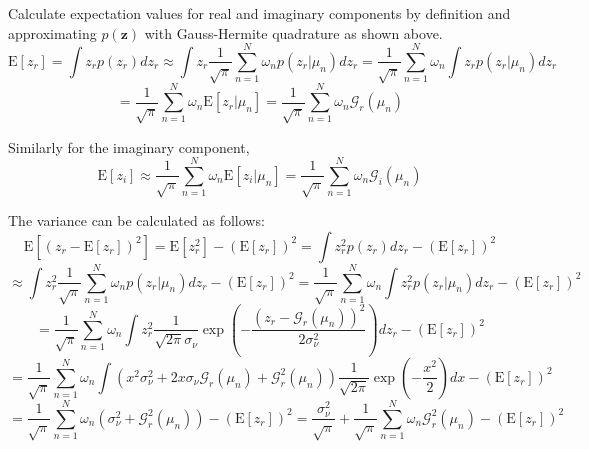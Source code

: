 \documentclass{article}         %
\theoremstyle{definition}
\theoremstyle{remark}
\newcommand{\eq}[1]{\begin{equation} #1 \end{equation}}
\newcommand{\zbf}{\mathbf{z}}
\newcommand{\Gscript}{\mathcal{G}}
\newcommand{\paren}[1]{\left(#1\right)}
\newcommand{\expect}[1]{\mathrm{E}\left[#1\right]}
\newcommand{\normpdf}[3]{\frac{1}{\sqrt{2\pi}#3}\exp\paren{-\frac{\paren{#1-#2}^2}{2#3^2}}}
\begin{document}
Calculate expectation values for real and imaginary components by definition and approximating $p\paren{\zbf}$ with Gauss-Hermite quadrature as shown above.
\eq{\expect{z_r} = \int z_r p\paren{z_r}dz_r \approx \int z_r\frac{1}{\sqrt{\pi}}\sum_{n=1}^N\omega_np\paren{z_r|\mu_n}dz_r
= \frac{1}{\sqrt{\pi}}\sum_{n=1}^N\omega_n\int z_r p\paren{z_r|\mu_n}dz_r}
\eq{=\frac{1}{\sqrt{\pi}}\sum_{n=1}^N\omega_n\expect{z_r|\mu_n} = \frac{1}{\sqrt{\pi}}\sum_{n=1}^N\omega_n\Gscript_r\paren{\mu_n}}

Similarly for the imaginary component,
\eq{\expect{z_i} \approx \frac{1}{\sqrt{\pi}}\sum_{n=1}^N\omega_n\expect{z_i|\mu_n} = \frac{1}{\sqrt{\pi}}\sum_{n=1}^N\omega_n\Gscript_i\paren{\mu_n}}

%

The variance can be calculated as follows:
\eq{\expect{\paren{z_r-\expect{z_r}}^2} = \expect{z_r^2}-\paren{\expect{z_r}}^2 = \int z_r^2p\paren{z_r}dz_r-\paren{\expect{z_r}}^2}
\eq{\approx \int z_r^2\frac{1}{\sqrt{\pi}}\sum_{n=1}^N\omega_np\paren{z_r|\mu_n}dz_r-\paren{\expect{z_r}}^2
= \frac{1}{\sqrt{\pi}}\sum_{n=1}^N\omega_n\int z_r^2p\paren{z_r|\mu_n}dz_r-\paren{\expect{z_r}}^2}
\eq{= \frac{1}{\sqrt{\pi}}\sum_{n=1}^N\omega_n\int z_r^2\normpdf{z_r}{\Gscript_r\paren{\mu_n}}{\sigma_\nu}dz_r-\paren{\expect{z_r}}^2}
\eq{= \frac{1}{\sqrt{\pi}}\sum_{n=1}^N\omega_n\int\paren{x^2\sigma_\nu^2+2x\sigma_\nu\Gscript_r\paren{\mu_n}+\Gscript_r^2\paren{\mu_n}}
\frac{1}{\sqrt{2\pi}}\exp\paren{-\frac{x^2}{2}}dx-\paren{\expect{z_r}}^2}
\eq{= \frac{1}{\sqrt{\pi}}\sum_{n=1}^N\omega_n\paren{\sigma_\nu^2+\Gscript_r^2\paren{\mu_n}}-\paren{\expect{z_r}}^2
= \frac{\sigma_\nu^2}{\sqrt{\pi}}+\frac{1}{\sqrt{\pi}}\sum_{n=1}^N\omega_n\Gscript_r^2\paren{\mu_n}-\paren{\expect{z_r}}^2}
\end{document}
